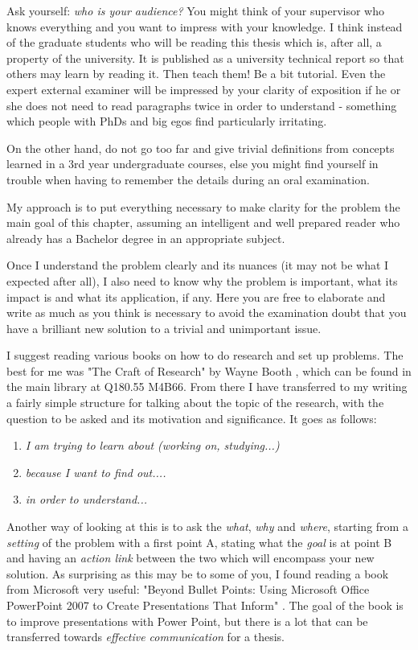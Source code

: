 Ask yourself:
\textit{who is your audience?} You might think of your supervisor who knows everything and you want to impress with your knowledge. I think instead of the graduate students who will be reading this thesis which is, after all, a property of the university. It is published as a university technical report so that others may learn by reading it. Then teach them! Be a bit tutorial. Even the expert external examiner will be impressed by your clarity of exposition if he or she does not need to read paragraphs twice in order to understand - something which people with PhDs and big egos find particularly irritating.

On the other hand, do not go too far and give trivial definitions from concepts learned in a 3rd year undergraduate courses, else you might find yourself in trouble when having to remember the details during an oral examination.

My approach is to put everything necessary to make clarity for
the problem the main goal of this chapter, assuming an intelligent and well prepared reader who already has a Bachelor degree in an appropriate subject.

Once I understand the problem clearly and its nuances (it may not be what I expected after all), I also need to know why the problem is important, what its impact is and what its application, if any. Here you are free to elaborate and write as much as you think is necessary to avoid the examination doubt that you have a brilliant new solution to a trivial and unimportant issue.

I suggest reading various books on how to do research and set up problems. The best for me was "The Craft of Research" by Wayne Booth \cite{booth1}, which can be found in the main library at Q180.55 M4B66. From there I have transferred to my writing a fairly simple structure for talking about the topic of the research, with the question to be asked and its motivation and significance. It goes as follows:
\begin{enumerate}
\item {\textit{I am trying to learn about (working on, studying...)}}
\item {\textit{because I want to find out....}}
\item {\textit{in order to understand...}}
\end{enumerate}

Another way of looking at this is to ask the
\textit{what}, \textit{why} and \textit{where}, starting from a \textit{setting} of the problem with a first point A, stating what the \textit{goal} is at point B and having an \textit{action link} between the two which will encompass your new solution. As surprising as this may be to some of you, I found reading a book from Microsoft very useful: "Beyond Bullet Points: Using Microsoft Office PowerPoint 2007 to Create Presentations That Inform" \cite {atkin}. The goal of the book is to improve presentations with Power Point, but there is a lot that can be transferred towards \textit{effective communication} for a thesis.

